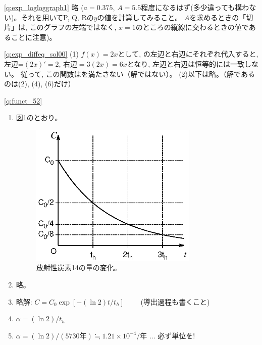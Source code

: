\ref{q:exp_logloggraph1} 略 
($a=0.375$, $A=5.5$程度になるはず(多少違っても構わない)。それを用いてP, Q, Rの$y$の値を計算してみること。
$A$を求めるときの「切片」は, このグラフの左端ではなく, $x=1$のところの縦線に交わるときの値であることに注意)。
\mv

\ref{q:exp_diffeq_sol00} (1) $f(x)=2x$として, 
の左辺と右辺にそれぞれ代入すると, 
左辺=$(2x)'=2$, 右辺$=3(2x)=6x$となり, 左辺と右辺は恒等的には一致しない。
従って, この関数はを満たさない（解ではない）。
(2)以下は略。（解であるのは(2), (4), (6)だけ）
\mv



\ref{q:funct_52}　
\begin{enumerate}
\item 図\ref{fig:Cchange}のとおり。
\begin{figure}
    \centering
    \includegraphics[width=8cm]{Cchange.eps}
    \caption{放射性炭素14の量の変化。\label{fig:Cchange}}
\end{figure}
\item 略。
\item 略解: $C=C_0 \exp[-(\ln 2) t/t_h]$ 　　(導出過程も書くこと)
\item $\alpha=(\ln 2)/t_h$
\item $\alpha=(\ln 2)/(5730\text{年})\fallingdotseq1.21\times 10^{-4}$/年 ... 必ず単位を!
\end{enumerate}
\mv

